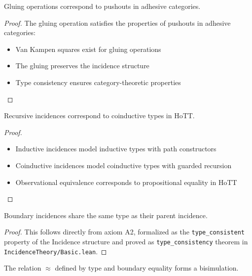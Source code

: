 \documentclass{article}
\begin{document}
\begin{theorem}
\label{thm:adhesive-model}
Gluing operations correspond to pushouts in adhesive categories.
\end{theorem}

\begin{proof}
The gluing operation satisfies the properties of pushouts in adhesive categories:
\begin{itemize}
\item Van Kampen squares exist for gluing operations
\item The gluing preserves the incidence structure
\item Type consistency ensures category-theoretic properties
\end{itemize}
\end{proof}

\begin{theorem}
\label{thm:hott-model}
Recursive incidences correspond to coinductive types in HoTT.
\end{theorem}

\begin{proof}
\begin{itemize}
\item Inductive incidences model inductive types with path constructors
\item Coinductive incidences model coinductive types with guarded recursion
\item Observational equivalence corresponds to propositional equality in HoTT
\end{itemize}
\end{proof}

\begin{theorem}
\label{thm:type-consistency-semantic}
Boundary incidences share the same type as their parent incidence.
\end{theorem}

\begin{proof}
This follows directly from axiom A2, formalized as the \texttt{type\_consistent} property of the Incidence structure and proved as \texttt{type\_consistency} theorem in \texttt{IncidenceTheory/Basic.lean}.
\end{proof}

\begin{theorem}
\label{thm:observational-bisimulation}
The relation $\approx$ defined by type and boundary equality forms a bisimulation.
\end{theorem}
\end{document}
